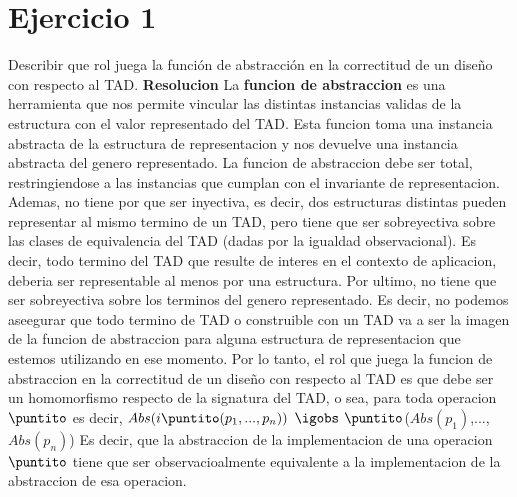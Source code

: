 \documentclass[10pt,a4paper]{article}
\begin{document}
\maketitle

\section{Ejercicio 1}

Describir que rol juega la función de abstracción en la correctitud de un diseño con respecto al TAD.
\newline
\newline
\textbf{Resolucion}
\newline
\newline
La \textbf{funcion de abstraccion} es una herramienta que nos permite vincular las distintas instancias validas de la estructura con el valor representado del TAD. Esta funcion toma una instancia abstracta de la estructura de representacion y nos devuelve una instancia abstracta del genero representado.
\newline
\newline
La funcion de abstraccion debe ser total, restringiendose a las instancias que cumplan con el invariante de representacion. 
\newline
\newline
Ademas, no tiene por que ser inyectiva, es decir, dos estructuras distintas pueden representar al mismo termino de un TAD, pero tiene que ser sobreyectiva sobre las clases de equivalencia del TAD (dadas por la igualdad observacional). Es decir, todo termino del TAD que resulte de interes en el contexto de aplicacion, deberia ser representable al menos por una estructura.   
\newline
\newline
Por ultimo, no tiene que ser sobreyectiva sobre los terminos del genero representado. Es decir, no podemos aseegurar que todo termino de TAD o construible con un TAD va a ser la imagen de la funcion de abstraccion para alguna estructura de representacion que estemos utilizando en ese momento.
\newline
\newline
Por lo tanto, el rol que juega la funcion de abstraccion en la correctitud de un diseño con respecto al TAD es que debe ser un homomorfismo respecto de la signatura del TAD, o sea, para toda operacion $\puntito$ es decir,
\newline
\newline
$Abs(i \puntito (p_{1},...,p_{n}))$ $\igobs$ $\puntito$($Abs(p_{1})$,...,$Abs(p_{n})$)
\newline
\newline
Es decir, que la abstraccion de la implementacion de una operacion $\puntito$ tiene que ser observacioalmente equivalente a la implementacion de la abstraccion de esa operacion. 
\newpage
\end{document}
